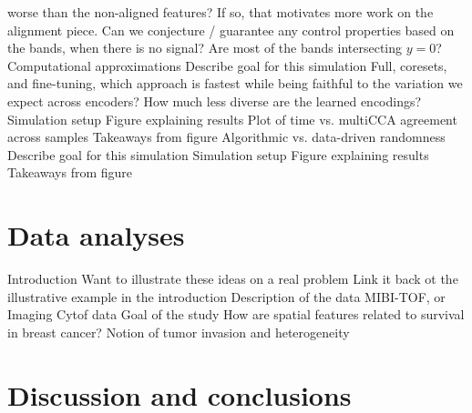 \documentclass[11pt]{article}
\begin{document}
\begin{outline}
        worse than the non-aligned features? If so, that motivates more work on
        the alignment piece.
        \4 Can we conjecture / guarantee any control properties based on the
        bands, when there is no signal? Are most of the bands intersecting $y =
        0$?
  \1 Computational approximations
    \2 Describe goal for this simulation
      \3 Full, coresets, and fine-tuning, which approach is fastest while being
      faithful to the variation we expect across encoders?
    \2 How much less diverse are the learned encodings?
    \2 Simulation setup
    \2 Figure explaining results
      \3 Plot of time vs. multiCCA agreement across samples
    \2 Takeaways from figure
  \1 Algorithmic vs. data-driven randomness
    \2 Describe goal for this simulation
    \2 Simulation setup
    \2 Figure explaining results
    \2 Takeaways from figure
\end{outline}

\section{Data analyses}

\begin{outline}
  \1 Introduction
    \2 Want to illustrate these ideas on a real problem
      \3 Link it back ot the illustrative example in the introduction
    \2 Description of the data
      \3 MIBI-TOF, or Imaging Cytof data
  \1 Goal of the study
    \2 How are spatial features related to survival in breast cancer?
    \2 Notion of tumor invasion and heterogeneity
\end{outline}

\section{Discussion and conclusions}
\end{document}
